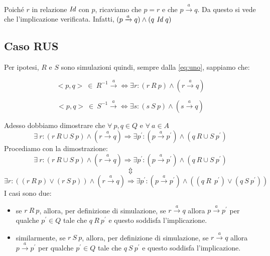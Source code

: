 		Poich\'e $r$ \eacc in relazione $\emph{Id}$ con $p$, ricaviamo che $p = r$ e che $p \xrightarrow{a} q$. Da questo si vede che l'implicazione \eacc verificata. Infatti, $(p \xrightarrow{a} q) \land (q \ \emph{Id} \ q)$
		
		\newpage
		
		\subsection{Caso RUS}
		
		Per ipotesi, $R$ e $S$ sono simulazioni quindi, sempre dalla \eqref{eq:uno}, sappiamo che:
		\vspace{-10 mm}
		\begin{center}
			\begin{equation}
			\label{tre}
			<p,q>\ \in \ R^{-1} \xrightarrow{a}  \Leftrightarrow \exists r: (r \ R \ p) \land (r \xrightarrow{a} q)
			\end{equation}
		\end{center}
		\vspace{-10 mm}
		\begin{center}
			\begin{equation}
			\label{quattro}
			<p,q>\ \in \ S^{-1} \xrightarrow{a}  \Leftrightarrow \exists s: (s \ S \ p) \land (s \xrightarrow{a} q)
			\end{equation}
		\end{center}
		Adesso dobbiamo dimostrare che $\forall \ p,q \in Q$ e $\forall \ a \in A$ $$\exists \ r: (r \ R\cup S \ p) \land (r \xrightarrow{a} q) \Rightarrow \exists p^{'}: (p \xrightarrow{a} p^{'})\land (q \ R\cup S \ p^{'})$$
		Procediamo con la dimostrazione: 
		$$\exists \ r: (r \ R\cup S \ p) \land (r \xrightarrow{a} q) \Rightarrow \exists p^{'}: (p \xrightarrow{a} p^{'})\land (q \ R\cup S \ p^{'})$$
		\vspace{-8 mm}
		$$\Updownarrow$$
		$$\exists r: ((r \ R\ p) \lor (r \ S\ p)) \land (r \xrightarrow{a} q) \Rightarrow \exists p^{'}: (p \xrightarrow{a} p^{'})\land ((q \ R\ \ p^{'})\lor(q \ S \ p^{'}))$$
		I casi sono due:
		\begin{itemize}
			\item se $r \ R\ p$, allora, per definizione di simulazione, se $r \xrightarrow{a} q$ allora $p\xrightarrow{a} p^{'}$ per qualche $p^{'}\in Q$ tale che $q \ R \ p^{'}$ e questo soddisfa l'implicazione.
			\item similarmente, se $r \ S\ p$, allora, per definizione di simulazione, se $r \xrightarrow{a} q$ allora $p\xrightarrow{a} p^{'}$ per qualche $p^{'}\in Q$ tale che $q \ S \ p^{'}$ e questo soddisfa l'implicazione.
		\end{itemize}
		
